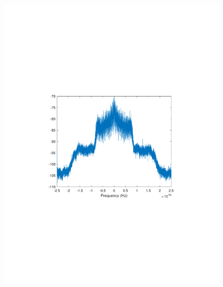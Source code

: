 \begin{refsection}
\begin{figure}[H]
	\centering
	\begin{minipage}{0.30\textwidth}
		\centering
		\includegraphics[clip, trim=4cm 8cm 4cm 8cm, width=1\textwidth]{./sdf/m_qam_system/figures/expResults/homodyne/0_16GBdInSig13dB_bfFec.pdf}
		\label{fig:16GBdEyeBefFecHm}
	\end{minipage}
	\begin{minipage}{0.30\textwidth}
		\centering

\end{minipage}
\end{figure}
\end{refsection}

